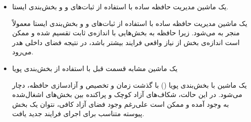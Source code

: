 \begin{enumerate}
	
	\begin{itemize}
		\item یک ماشین مدیریت حافظه ساده با استفاده از ثبات‌های  و  و بخش‌بندی ایستا.
		
		\begin{qsolve}
	یک ماشین مدیریت حافظه ساده با استفاده از ثبات‌های  و  و بخش‌بندی ایستا معمولاً منجر به  می‌شود. زیرا حافظه به بخش‌هایی با اندازه‌ی ثابت تقسیم شده و ممکن است اندازه‌ی بخش از نیاز واقعی فرایند بیشتر باشد، در نتیجه فضای داخلی هدر می‌رود.
		\end{qsolve}
		
		\item یک ماشین مشابه قسمت قبل با استفاده از بخش‌بندی پویا
	
		\begin{qsolve}
	یک ماشین با بخش‌بندی پویا () با گذشت زمان و تخصیص و آزادسازی حافظه، دچار  می‌شود. در این حالت، شکاف‌های آزاد کوچک و پراکنده بین بخش‌های اشغال‌شده به وجود آمده و ممکن است علی‌رغم وجود فضای آزاد کافی، نتوان یک بخش پیوسته متناسب برای اجرای فرایند جدید یافت.
		\end{qsolve}
		
	\end{itemize}
\end{enumerate}






